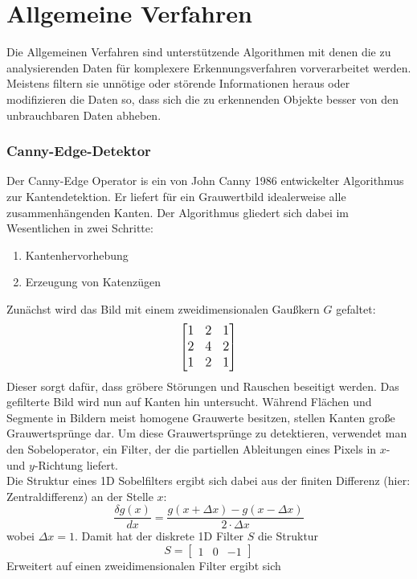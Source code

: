 
\chapter{Allgemeine Verfahren}
\label{chap:k3}
Die Allgemeinen Verfahren sind unterstützende Algorithmen mit denen die zu analysierenden Daten für komplexere Erkennungsverfahren vorverarbeitet werden. Meistens filtern sie unnötige oder störende Informationen heraus oder modifizieren die Daten so, dass sich die zu erkennenden Objekte besser von den unbrauchbaren Daten abheben.
	\subsection {Canny-Edge-Detektor}
		Der Canny-Edge Operator is ein von John Canny 1986 entwickelter Algorithmus zur Kantendetektion. Er liefert für ein Grauwertbild idealerweise alle zusammenhängenden Kanten. Der Algorithmus gliedert sich dabei im Wesentlichen in zwei Schritte:
\begin{enumerate}
	\item Kantenhervorhebung
	\item Erzeugung von Katenzügen
\end{enumerate}

Zunächst wird das Bild mit einem zweidimensionalen Gaußkern $G$ gefaltet:
{\[\large \begin{bmatrix}
1 & 2 & 1\\ 
2 & 4 & 2 \\ 
1 & 2 & 1
\end{bmatrix}\]}
Dieser sorgt dafür, dass gröbere Störungen und Rauschen beseitigt werden.
Das gefilterte Bild wird nun auf Kanten hin untersucht. Während Flächen und Segmente in Bildern meist homogene Grauwerte besitzen, stellen Kanten große Grauwertsprünge dar. Um diese Grauwertsprünge zu detektieren, verwendet man den Sobeloperator, ein Filter, der die partiellen Ableitungen eines Pixels in $x$- und $y$-Richtung liefert. \\
Die Struktur eines 1D Sobelfilters ergibt sich dabei aus der finiten Differenz (hier: Zentraldifferenz) an der Stelle $x$:
\begin{equation*}
\frac{\delta g(x)}{dx} = \frac{g(x + \Delta x) - g(x - \Delta x)}{2 \cdot \Delta x }
\end{equation*}
wobei $\Delta x = 1$. Damit hat der diskrete 1D Filter $S$ die Struktur
\begin{equation*}
S = \begin{bmatrix}
1 & 0 & -1
\end{bmatrix}
\end{equation*}
Erweitert auf einen zweidimensionalen Filter ergibt sich

